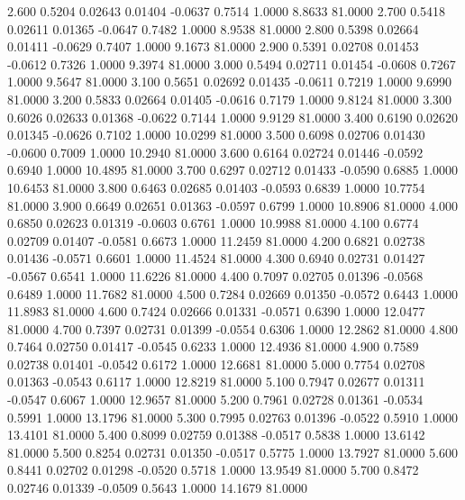    2.600   0.5204   0.02643   0.01404  -0.0637   0.7514   1.0000   8.8633  81.0000
   2.700   0.5418   0.02611   0.01365  -0.0647   0.7482   1.0000   8.9538  81.0000
   2.800   0.5398   0.02664   0.01411  -0.0629   0.7407   1.0000   9.1673  81.0000
   2.900   0.5391   0.02708   0.01453  -0.0612   0.7326   1.0000   9.3974  81.0000
   3.000   0.5494   0.02711   0.01454  -0.0608   0.7267   1.0000   9.5647  81.0000
   3.100   0.5651   0.02692   0.01435  -0.0611   0.7219   1.0000   9.6990  81.0000
   3.200   0.5833   0.02664   0.01405  -0.0616   0.7179   1.0000   9.8124  81.0000
   3.300   0.6026   0.02633   0.01368  -0.0622   0.7144   1.0000   9.9129  81.0000
   3.400   0.6190   0.02620   0.01345  -0.0626   0.7102   1.0000  10.0299  81.0000
   3.500   0.6098   0.02706   0.01430  -0.0600   0.7009   1.0000  10.2940  81.0000
   3.600   0.6164   0.02724   0.01446  -0.0592   0.6940   1.0000  10.4895  81.0000
   3.700   0.6297   0.02712   0.01433  -0.0590   0.6885   1.0000  10.6453  81.0000
   3.800   0.6463   0.02685   0.01403  -0.0593   0.6839   1.0000  10.7754  81.0000
   3.900   0.6649   0.02651   0.01363  -0.0597   0.6799   1.0000  10.8906  81.0000
   4.000   0.6850   0.02623   0.01319  -0.0603   0.6761   1.0000  10.9988  81.0000
   4.100   0.6774   0.02709   0.01407  -0.0581   0.6673   1.0000  11.2459  81.0000
   4.200   0.6821   0.02738   0.01436  -0.0571   0.6601   1.0000  11.4524  81.0000
   4.300   0.6940   0.02731   0.01427  -0.0567   0.6541   1.0000  11.6226  81.0000
   4.400   0.7097   0.02705   0.01396  -0.0568   0.6489   1.0000  11.7682  81.0000
   4.500   0.7284   0.02669   0.01350  -0.0572   0.6443   1.0000  11.8983  81.0000
   4.600   0.7424   0.02666   0.01331  -0.0571   0.6390   1.0000  12.0477  81.0000
   4.700   0.7397   0.02731   0.01399  -0.0554   0.6306   1.0000  12.2862  81.0000
   4.800   0.7464   0.02750   0.01417  -0.0545   0.6233   1.0000  12.4936  81.0000
   4.900   0.7589   0.02738   0.01401  -0.0542   0.6172   1.0000  12.6681  81.0000
   5.000   0.7754   0.02708   0.01363  -0.0543   0.6117   1.0000  12.8219  81.0000
   5.100   0.7947   0.02677   0.01311  -0.0547   0.6067   1.0000  12.9657  81.0000
   5.200   0.7961   0.02728   0.01361  -0.0534   0.5991   1.0000  13.1796  81.0000
   5.300   0.7995   0.02763   0.01396  -0.0522   0.5910   1.0000  13.4101  81.0000
   5.400   0.8099   0.02759   0.01388  -0.0517   0.5838   1.0000  13.6142  81.0000
   5.500   0.8254   0.02731   0.01350  -0.0517   0.5775   1.0000  13.7927  81.0000
   5.600   0.8441   0.02702   0.01298  -0.0520   0.5718   1.0000  13.9549  81.0000
   5.700   0.8472   0.02746   0.01339  -0.0509   0.5643   1.0000  14.1679  81.0000
